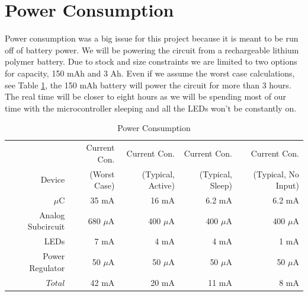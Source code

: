 \documentclass[12pt]{article}
\begin{document}
\section{Power Consumption}
Power consumption was a big issue for this project because it is  meant to be run off of battery power. We will be powering the circuit from a rechargeable lithium polymer battery. Due to stock and size constraints we are limited to two options for capacity, 150 mAh and 3 Ah. Even if we assume the worst case calculations, see Table \ref{Power}, the 150 mAh battery will power the circuit for more than 3 hours. The real time will be closer to eight hours as we will be spending most of our time with the microcontroller sleeping and all the LEDs won't be constantly on.

\begin{table}[!h]
   \centering
    \begin{tabular}{|r|r|r|r|r|}
        \hline
         & Current Con.& Current Con.& Current Con. & Current Con. \\
        Device & (Worst Case)& (Typical, Active)& (Typical, Sleep) & (Typical, No Input) \\ \hline
       $\mu$C \footnotemark & 35 mA & 16 mA & 6.2 mA & 6.2 mA \\ \hline
       Analog Subcircuit \footnotemark & 680 $\mu$A & 400 $\mu$A & 400 $\mu$A & 400 $\mu$A \\ \hline
       LEDs \footnotemark & 7 mA & 4 mA & 4 mA & 1 mA \\ \hline
       Power Regulator \footnotemark & 50 $\mu$A & 50 $\mu$A & 50 $\mu$A & 50 $\mu$A \\ \hline 
       $Total$ & 42 mA & 20 mA & 11 mA & 8 mA\\ \hline 
    \end{tabular}
	\caption{Power Consumption}
	\label{Power} 
\end{table}

\end{document}
